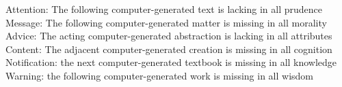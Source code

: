 \documentclass[12pt,a4paper,oneside]{book}
\begin{document}
\begin{Huge}
Attention: The following computer-generated text is lacking in all prudence
\newline \newline
Message: The following computer-generated matter is missing in all morality 
\newline \newline
Advice: The acting computer-generated abstraction is lacking in all attributes 
\newline \newline
Content: The adjacent computer-generated creation is missing in all cognition 
\newline \newline
Notification: the next computer-generated textbook is missing in all knowledge
\newline \newline
Warning: the following computer-generated work is missing in all wisdom


\end{Huge}
\newpage
\end{document}
